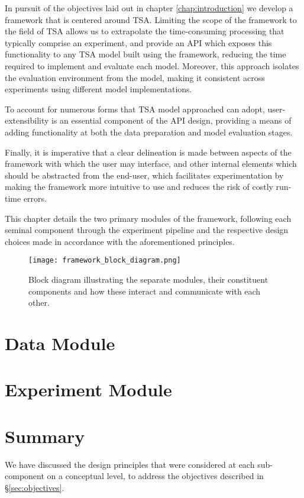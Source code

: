 \documentclass[../../fyp.tex]{subfiles}
\begin{document}
 
In pursuit of the objectives laid out in chapter \ref{chap:introduction} we develop a framework that is centered around TSA. Limiting the scope of the framework to the field of TSA allows us to extrapolate the time-consuming processing that typically comprise an experiment, and provide an API which exposes this functionality to any TSA model built using the framework, reducing the time required to implement and evaluate each model. Moreover, this approach isolates the evaluation environment from the model, making it consistent across experiments using different model implementations.

To account for numerous forms that TSA model approached can adopt, user-extensibility is an essential component of the API design, providing a means of adding functionality at both the data preparation and model evaluation stages. 

Finally, it is imperative that a clear delineation is made between aspects of the framework with which the user may interface, and other internal elements which should be abstracted from the end-user, which facilitates experimentation by making the framework more intuitive to use and reduces the risk of costly run-time errors.  

This chapter details the two primary modules of the framework, following each seminal component through the experiment pipeline and the respective design choices made in accordance with the aforementioned principles.

\begin{figure}[!ht]
	\texttt{[image: framework\_block\_diagram.png]}
	\caption{Block diagram illustrating the separate modules, their constituent components and how these interact and communicate with each other.}
	\label{fig:framework_block_diagram}
\end{figure}

\section{Data Module} \label{sec:data_module}


\section{Experiment Module} \label{sec:experiment_module}


\section{Summary}
We have discussed the design principles that were considered at each sub-component on a conceptual level, to address the objectives described in \S\ref{sec:objectives}. 
\end{document}
